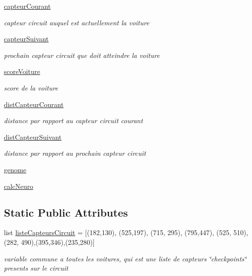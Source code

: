 \begin{DoxyCompactItemize}
\hyperlink{classsrc_1_1_voiture_1_1voiture_1_1_voiture_a5f8b17c1a34732cb2b26df5a79371e58}{capteur\+Courant}
\begin{DoxyCompactList}\small\item\em capteur circuit auquel est actuellement la voiture \end{DoxyCompactList}\item 
\hyperlink{classsrc_1_1_voiture_1_1voiture_1_1_voiture_a8e621a5d8bd2896829e44ccecaa672cb}{capteur\+Suivant}
\begin{DoxyCompactList}\small\item\em prochain capteur circuit que doit atteindre la voiture \end{DoxyCompactList}\item 
\hyperlink{classsrc_1_1_voiture_1_1voiture_1_1_voiture_add678a941c9d0c9222a18bd337bd77da}{score\+Voiture}
\begin{DoxyCompactList}\small\item\em score de la voiture \end{DoxyCompactList}\item 
\hyperlink{classsrc_1_1_voiture_1_1voiture_1_1_voiture_a18260cb22364f4a2a253c528701a26c1}{dist\+Capteur\+Courant}
\begin{DoxyCompactList}\small\item\em distance par rapport au capteur circuit courant \end{DoxyCompactList}\item 
\hyperlink{classsrc_1_1_voiture_1_1voiture_1_1_voiture_a5ab713c721352d5b00f07c38c7307aca}{dist\+Capteur\+Suivant}
\begin{DoxyCompactList}\small\item\em distance par rapport au prochain capteur circuit \end{DoxyCompactList}\item 
\hyperlink{classsrc_1_1_voiture_1_1voiture_1_1_voiture_afbb9cab19661eb3eb38def8c49c14dc3}{genome}
\item 
\hyperlink{classsrc_1_1_voiture_1_1voiture_1_1_voiture_a5ac2ed3c2a0de3b5eed4cdeae91b2123}{calc\+Neuro}
\end{DoxyCompactItemize}
\subsection*{Static Public Attributes}
\begin{DoxyCompactItemize}
\item 
list \hyperlink{classsrc_1_1_voiture_1_1voiture_1_1_voiture_ab8c5d7ecd3f9be4d77e0717c079fe8d1}{liste\+Capteurs\+Circuit} = \mbox{[}(182,130), (525,197), (715, 295), (795,447), (525, 510), (282, 490),(395,346),(235,280)\mbox{]}
\begin{DoxyCompactList}\small\item\em variable commune a toutes les voitures, qui est une liste de capteurs \char`\"{}checkpoints\char`\"{} presents sur le circuit \end{DoxyCompactList}\end{DoxyCompactItemize}


